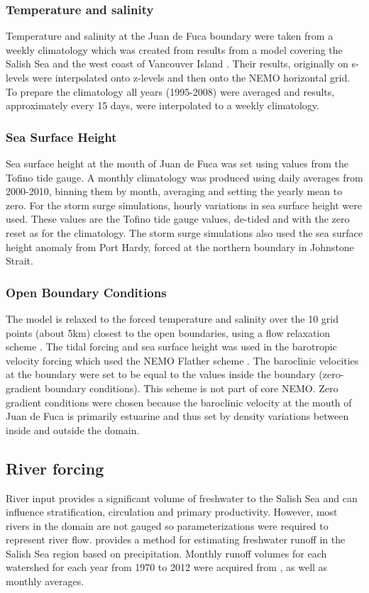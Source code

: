 \documentclass[pdftex,10pt]{article}
\begin{document}
\subsubsection{Temperature and salinity}
Temperature and salinity at the Juan de Fuca boundary were taken from a weekly climatology which was created from results from a model covering the Salish Sea and the west coast of Vancouver Island \citep{massonfine2012}.  Their results, originally on s-levels were interpolated onto z-levels and then onto the NEMO horizontal grid.  To prepare the climatology all years (1995-2008) were averaged and results, approximately every 15 days, were interpolated to a weekly climatology.

\subsubsection{Sea Surface Height}
Sea surface height at the mouth of Juan de Fuca was set using values from the Tofino tide gauge.  A monthly climatology was produced using daily averages from 2000-2010, binning them by month, averaging and setting the yearly mean to zero.  For the storm surge simulations, hourly variations in sea surface height were used.  These values are the Tofino tide gauge values, de-tided and with the zero reset as for the climatology. The storm surge simulations also used the sea surface height anomaly from Port Hardy, forced at the northern boundary in Johnstone Strait. 

\subsubsection{Open Boundary Conditions}

The model is relaxed to the forced temperature and salinity over the 10 grid points (about 5km) closest to the open boundaries, using a flow relaxation scheme \citep{engedahl1995use}. %
The tidal forcing and sea surface height was used in the barotropic velocity forcing which used the NEMO Flather scheme \citep{flather1994storm, madec2012nemo}.
The baroclinic velocities at the boundary were set to be equal to the values inside the boundary (zero-gradient boundary conditions).  This scheme is not part of core NEMO.  Zero gradient conditions were chosen because the baroclinic velocity at the mouth of Juan de Fuca is primarily estuarine and thus set by density variations between inside and outside the domain.

\subsection{River forcing}
River input provides a significant volume of freshwater to the Salish Sea and can influence stratification, circulation and primary productivity. However, most rivers in the domain are not gauged so parameterizations were required to represent river flow. \citet{morrison2011rivers} provides a method for estimating freshwater runoff in the Salish Sea region based on precipitation. Monthly runoff volumes for each watershed for each year from 1970 to 2012 were acquired from \citet{morrison2011rivers}, as well as monthly averages. 
\end{document}
